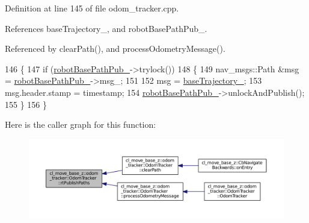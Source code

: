 Definition at line 145 of file odom\+\_\+tracker.\+cpp.



References base\+Trajectory\+\_\+, and robot\+Base\+Path\+Pub\+\_\+.



Referenced by clear\+Path(), and process\+Odometry\+Message().


\begin{DoxyCode}
146 \{
147     \textcolor{keywordflow}{if} (\hyperlink{classcl__move__base__z_1_1odom__tracker_1_1OdomTracker_a40a7cbb6bb6595e250e7c685c781613b}{robotBasePathPub\_}->trylock())
148     \{
149         nav\_msgs::Path &msg = \hyperlink{classcl__move__base__z_1_1odom__tracker_1_1OdomTracker_a40a7cbb6bb6595e250e7c685c781613b}{robotBasePathPub\_}->msg\_;
151 
152         msg = \hyperlink{classcl__move__base__z_1_1odom__tracker_1_1OdomTracker_a466d18a86df049f0f680e043bb5ea91f}{baseTrajectory\_};
153         msg.header.stamp = timestamp;
154         \hyperlink{classcl__move__base__z_1_1odom__tracker_1_1OdomTracker_a40a7cbb6bb6595e250e7c685c781613b}{robotBasePathPub\_}->unlockAndPublish();
155     \}
156 \}
\end{DoxyCode}


Here is the caller graph for this function\+:
\nopagebreak
\begin{figure}[H]
\begin{center}
\leavevmode
\includegraphics[width=350pt]{classcl__move__base__z_1_1odom__tracker_1_1OdomTracker_a8f728f85d1f3f49f4b94e37052a59d6d_icgraph}
\end{center}
\end{figure}


